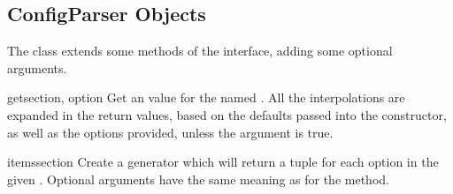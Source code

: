 \subsection{ConfigParser Objects \label{ConfigParser-objects}}

The  class extends some methods of the
 interface, adding some optional arguments.

\begin{methoddesc}{get}{section, option}
Get an  value for the named .  All the
\character{\%} interpolations are expanded in the return values, based
on the defaults passed into the constructor, as well as the options
 provided, unless the  argument is true.
\end{methoddesc}

\begin{methoddesc}{items}{section}
Create a generator which will return a tuple  for
each option in the given . Optional arguments have the
same meaning as for the  method.
\end{methoddesc}
